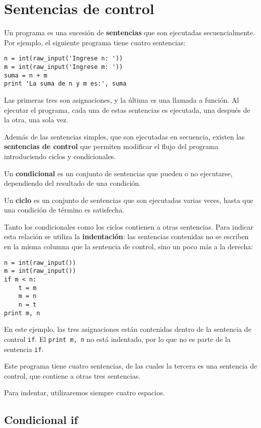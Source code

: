 \chapter{Sentencias de control}

Un programa es una sucesión de \textbf{sentencias} que son ejecutadas
secuencialmente.
Por ejemplo, el siguiente programa tiene cuatro sentencias:
\begin{lstlisting}
n = int(raw_input('Ingrese n: '))
m = int(raw_input('Ingrese m: '))
suma = n + m
print 'La suma de n y m es:', suma
\end{lstlisting}

Las primeras tres son asignaciones, y la última es una llamada a
función. Al ejecutar el programa, cada una de estas sentencias es
ejecutada, una después de la otra, una sola vez.

Además de las sentencias simples, que son ejecutadas en secuencia,
existen las \textbf{sentencias de control} que permiten modificar el
flujo del programa introduciendo ciclos y condicionales.

Un \textbf{condicional} es un conjunto de sentencias que pueden o no
ejecutarse, dependiendo del resultado de una condición.

Un \textbf{ciclo} es un conjunto de sentencias que son ejecutadas varias
veces, hasta que una condición de término es satisfecha.

Tanto los condicionales como los ciclos contienen a otras sentencias.
Para indicar esta relación se utiliza la \textbf{indentación}: las
sentencias contenidas no se escriben en la misma columna que la
sentencia de control, sino un poco más a la derecha:

\begin{lstlisting}
n = int(raw_input())
m = int(raw_input())
if m < n:
    t = m
    m = n
    n = t
print m, n
\end{lstlisting}

En este ejemplo, las tres asignaciones están contenidas dentro de la
sentencia de control \lstinline!if!. El \lstinline!print m, n! no está
indentado, por lo que no es parte de la sentencia \lstinline!if!.

Este programa tiene cuatro sentencias, de las cuales la tercera es una
sentencia de control, que contiene a otras tres sentencias.

Para indentar, utilizaremos siempre cuatro espacios.

\section{Condicional if}

